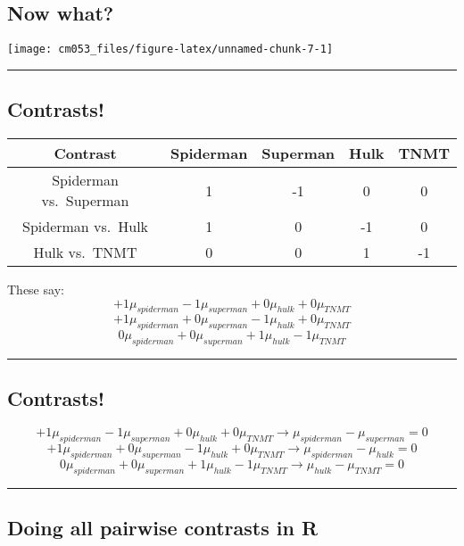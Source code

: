\documentclass[]{article}
\begin{document}
\hypertarget{now-what}{%
\subsection{Now what?}\label{now-what}}

\texttt{[image: cm053\_files/figure-latex/unnamed-chunk-7-1]}

\begin{center}\rule{0.5\linewidth}{\linethickness}\end{center}

\hypertarget{contrasts}{%
\subsection{Contrasts!}\label{contrasts}}

\begin{longtable}[]{@{}ccccc@{}}
\toprule
Contrast & Spiderman & Superman & Hulk & TNMT\tabularnewline
\midrule
\endhead
Spiderman vs.~Superman & 1 & -1 & 0 & 0\tabularnewline
Spiderman vs.~Hulk & 1 & 0 & -1 & 0\tabularnewline
Hulk vs.~TNMT & 0 & 0 & 1 & -1\tabularnewline
\bottomrule
\end{longtable}

These say: \[+1\mu_{spiderman}-1\mu_{superman}+0\mu_{hulk}+0\mu_{TNMT}\]
\[+1\mu_{spiderman}+0\mu_{superman}-1\mu_{hulk}+0\mu_{TNMT}\]
\[0\mu_{spiderman}+0\mu_{superman}+1\mu_{hulk}-1\mu_{TNMT}\]

\begin{center}\rule{0.5\linewidth}{\linethickness}\end{center}

\hypertarget{contrasts-1}{%
\subsection{Contrasts!}\label{contrasts-1}}

\[+1\mu_{spiderman}-1\mu_{superman}+0\mu_{hulk}+0\mu_{TNMT}\rightarrow\mu_{spiderman}-\mu_{superman}=0\]
\[+1\mu_{spiderman}+0\mu_{superman}-1\mu_{hulk}+0\mu_{TNMT}\rightarrow\mu_{spiderman}-\mu_{hulk}=0\]
\[0\mu_{spiderman}+0\mu_{superman}+1\mu_{hulk}-1\mu_{TNMT}\rightarrow\mu_{hulk}-\mu_{TNMT}=0\]

\begin{center}\rule{0.5\linewidth}{\linethickness}\end{center}

\hypertarget{doing-all-pairwise-contrasts-in-r}{%
\subsection{Doing all pairwise contrasts in
R}\label{doing-all-pairwise-contrasts-in-r}}
\end{document}
